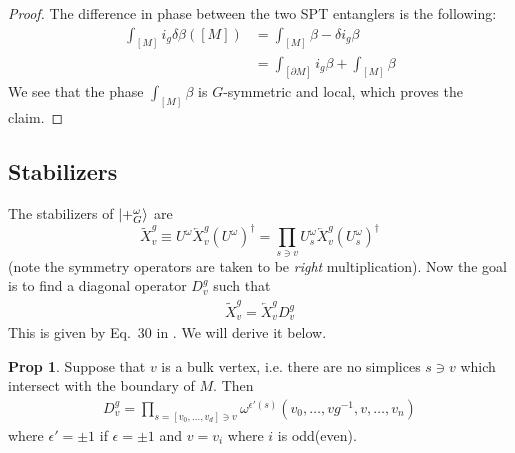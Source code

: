 \documentclass{article}
\theoremstyle{definition}
\theoremstyle{definition}
\newtheorem{prop}{Prop}
\begin{document}
\begin{proof}
  The difference in phase between the two SPT entanglers is the following:
\begin{align}
  \int_{[M]} i_g\delta\beta ([M]) &= \int_{[M]}\beta - \delta i_g\beta  \\
  &= \int_{[\partial M]}i_g \beta + \int_{[M]} \beta
\end{align}
 We see that the phase $\int_{[M]}\beta$ is $G$-symmetric and local, which
 proves the claim.
\end{proof}

\subsection{Stabilizers}
The stabilizers of $\ket{+_G^\omega}$ are
\begin{equation}\label{eq:TQD-stabilizers-definition}
\widetilde X_v^g \equiv U^\omega \overleftarrow X_v^g (U^{\omega})^\dagger = \prod_{s \ni v}U_{s}^\omega \overleftarrow X_v^g (U^{\omega}_s)^\dagger 
\end{equation}
(note the symmetry operators are taken to be \textit{right} multiplication). Now the goal is to find a diagonal operator $D_v^g$ such that
\begin{align}\label{eq:phase-of-TQD-stabilizers-definition}
\widetilde X^g_v = \overleftarrow X^g_vD_{v}^g
\end{align}
This is given by Eq.~30 in \cite{Yoshida_2017}. We will derive it below.
\begin{prop}\label{prop:formula-for-TQD-stabilizer-phase}
  Suppose that $v$ is a bulk vertex, i.e. there are no simplices $s \ni v$ which
  intersect with the boundary of $M$. Then
  \begin{align}
D_v^g = \prod_{s = [v_0, \dots, v_d] \ni v}\omega^{\epsilon'(s)}(v_0, \ldots, vg^{-1}, v, \ldots, v_n)
   \end{align}
   where $\epsilon' = \pm 1$ if $\epsilon = \pm 1$ and $v = v_i$ where $i$ is odd(even).
\end{prop}
\end{document}
